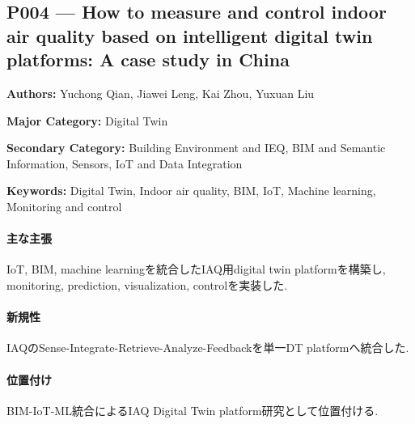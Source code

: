 \subsection{P004 --- How to measure and control indoor air quality based on intelligent digital twin platforms: A case study in China}
\label{paper:P004}
\textbf{Authors:} Yuchong Qian, Jiawei Leng, Kai Zhou, Yuxuan Liu\par
\textbf{Major Category:} Digital Twin\par
\textbf{Secondary Category:} Building Environment and IEQ, BIM and Semantic Information, Sensors, IoT and Data Integration\par
\textbf{Keywords:} Digital Twin, Indoor air quality, BIM, IoT, Machine learning, Monitoring and control\par
\paragraph{主な主張}
IoT, BIM, machine learningを統合したIAQ用digital twin platformを構築し, monitoring, prediction, visualization, controlを実装した. \cite{Qian:2024IaqDT}
\paragraph{新規性}
IAQのSense-Integrate-Retrieve-Analyze-Feedbackを単一DT platformへ統合した.
\paragraph{位置付け}
BIM-IoT-ML統合によるIAQ Digital Twin platform研究として位置付ける.
